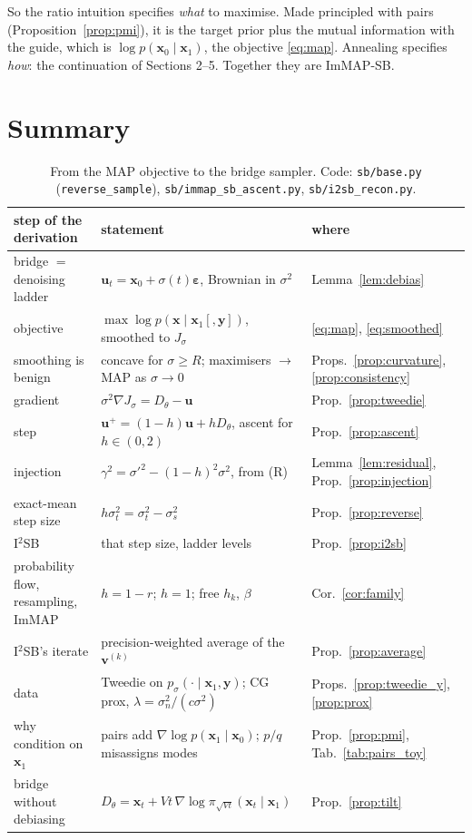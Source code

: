 \documentclass[11pt]{article}
\theoremstyle{definition}
\theoremstyle{remark}
\newcommand{\x}{\bm{x}}
\newcommand{\y}{\bm{y}}
\newcommand{\uu}{\bm{u}}
\newcommand{\vv}{\bm{v}}
\newcommand{\eps}{\bm{\varepsilon}}
\newcommand{\D}{D_\theta}
\newcommand{\grad}{\nabla}
\newcommand{\code}[1]{\texttt{#1}}
\begin{document}
So the ratio intuition specifies \emph{what} to maximise. Made principled with pairs
(Proposition~\ref{prop:pmi}), it is the target prior plus the mutual information with the
guide, which is $\log p(\x_0\mid\x_1)$, the objective \eqref{eq:map}. Annealing specifies
\emph{how}: the continuation of Sections 2--5. Together they are ImMAP-SB.

\section{Summary}

\begin{table}[h]
\centering
\footnotesize
\begin{tabular}{@{}lll@{}}
\toprule
step of the derivation & statement & where \\
\midrule
bridge $=$ denoising ladder & $\uu_t = \x_0 + \sigma(t)\eps$, Brownian in $\sigma^2$ &
  Lemma~\ref{lem:debias} \\
objective & $\max\log p(\x\mid\x_1[,\y])$, smoothed to $J_\sigma$ & \eqref{eq:map},
  \eqref{eq:smoothed} \\
smoothing is benign & concave for $\sigma\ge R$; maximisers $\to$ MAP as $\sigma\to0$ &
  Props.~\ref{prop:curvature}, \ref{prop:consistency} \\
gradient & $\sigma^2\grad J_\sigma = \D - \uu$ & Prop.~\ref{prop:tweedie} \\
step & $\uu^+ = (1-h)\uu + h\D$, ascent for $h\in(0,2)$ & Prop.~\ref{prop:ascent} \\
injection & $\gamma^2 = \sigma'^2-(1-h)^2\sigma^2$, from (R) & Lemma~\ref{lem:residual},
  Prop.~\ref{prop:injection} \\
exact-mean step size & $h\sigma_t^2 = \sigma_t^2-\sigma_s^2$ & Prop.~\ref{prop:reverse} \\
I$^2$SB & that step size, ladder levels & Prop.~\ref{prop:i2sb} \\
probability flow, resampling, ImMAP & $h = 1-r$; $h = 1$; free $h_k$, $\beta$ &
  Cor.~\ref{cor:family} \\
I$^2$SB's iterate & precision-weighted average of the $\vv^{(k)}$ & Prop.~\ref{prop:average} \\
data & Tweedie on $p_\sigma(\cdot\mid\x_1,\y)$; CG prox, $\lambda = \sigma_n^2/(c\sigma^2)$ &
  Props.~\ref{prop:tweedie_y}, \ref{prop:prox} \\
why condition on $\x_1$ & pairs add $\grad\log p(\x_1\mid\x_0)$; $p/q$ misassigns modes &
  Prop.~\ref{prop:pmi}, Tab.~\ref{tab:pairs_toy} \\
bridge without debiasing & $\D = \x_t + Vt\,\grad\log\pi_{\sqrt{Vt}}(\x_t\mid\x_1)$ &
  Prop.~\ref{prop:tilt} \\
\bottomrule
\end{tabular}
\caption{From the MAP objective to the bridge sampler. Code: \code{sb/base.py}
(\code{reverse\_sample}), \code{sb/immap\_sb\_ascent.py}, \code{sb/i2sb\_recon.py}.}
\label{tab:summary}
\end{table}
\end{document}
